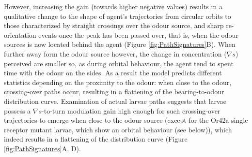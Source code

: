 \documentclass[11pt,a4paper]{article}
\begin{document}
However, increasing the gain (towards higher negative values) results in a qualitative change to the shape  of agent's trajectories from circular orbits to those characterized by straight crossings over the odour source, and sharp re-orientation events once the peak has been passed over, that is, when the odour sources is now located behind the agent (Figure \ref{fig:PathSignatures}B). When further away form the odour source however, the change in concentration ($\nabla s$) perceived are smaller so, as during orbital behaviour, the agent tend to spent time with the odour on the sides. As a result the model predicts different statistics depending on the proximity to the odour: when close to the odour, crossing-over paths occur, resulting in a flattening of the bearing-to-odour distribution curve. Examination of actual larvae paths suggests that larvae possess a $\nabla s$-to-turn modulation gain high enough for such crossing-over trajectories to emerge when close to the odour source (except for the Or42a single receptor mutant larvae, which show an orbital behaviour (see below)), which indeed results in a flattening of the distribution curve (Figure \ref{fig:PathSignatures}A, D).  
\end{document}
